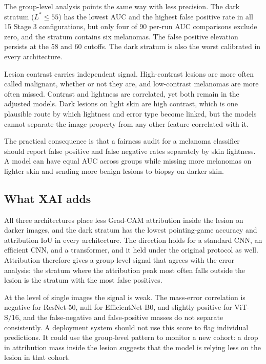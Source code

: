 \documentclass[11pt]{article}
\begin{document}
The group-level analysis points the same way with less precision. The dark stratum ($L^*\leq55$) has the lowest AUC and the highest false positive rate in all 15 Stage 3 configurations, but only four of 90 per-run AUC comparisons exclude zero, and the stratum contains six melanomas. The false positive elevation persists at the 58 and 60 cutoffs. The dark stratum is also the worst calibrated in every architecture.

Lesion contrast carries independent signal. High-contrast lesions are more often called malignant, whether or not they are, and low-contrast melanomas are more often missed. Contrast and lightness are correlated, yet both remain in the adjusted models. Dark lesions on light skin are high contrast, which is one plausible route by which lightness and error type become linked, but the models cannot separate the image property from any other feature correlated with it.

The practical consequence is that a fairness audit for a melanoma classifier should report false positive and false negative rates separately by skin lightness. A model can have equal AUC across groups while missing more melanomas on lighter skin and sending more benign lesions to biopsy on darker skin.

\subsection{What XAI adds}

All three architectures place less Grad-CAM attribution inside the lesion on darker images, and the dark stratum has the lowest pointing-game accuracy and attribution IoU in every architecture. The direction holds for a standard CNN, an efficient CNN, and a transformer, and it held under the original protocol as well. Attribution therefore gives a group-level signal that agrees with the error analysis: the stratum where the attribution peak most often falls outside the lesion is the stratum with the most false positives.

At the level of single images the signal is weak. The mass-error correlation is negative for ResNet-50, null for EfficientNet-B0, and slightly positive for ViT-S/16, and the false-negative and false-positive masses do not separate consistently. A deployment system should not use this score to flag individual predictions. It could use the group-level pattern to monitor a new cohort: a drop in attribution mass inside the lesion suggests that the model is relying less on the lesion in that cohort.
\end{document}

